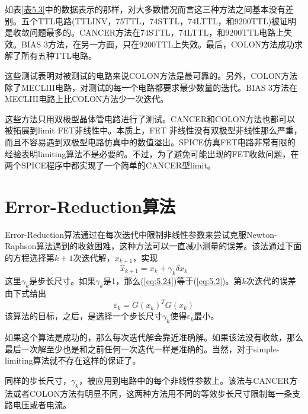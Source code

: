 如表\ref{表5.3}中的数据表示的那样，对大多数情况而言这三种方法之间基本没有差别。五个TTL电路(TTLINV，75TTL，74STTL，74LTTL，和9200TTL)被证明是收敛问题最多的。CANCER方法在74STTL，74LTTL，和9200TTL电路上失效。BIAS 3方法，在另一方面，只在9200TTL上失效。最后，COLON方法成功求解了所有五种TTL电路。

这些测试表明对被测试的电路来说COLON方法是最可靠的。另外，COLON方法除了MECLIII电路，对测试的每一个电路都要求最少数量的迭代。BIAS 3方法在MECLIII电路上比COLON方法少一次迭代。

这些方法只用双极型晶体管电路进行了测试。CANCER和COLON方法也都可以被拓展到limit FET非线性中。本质上，FET 非线性没有双极型非线性那么严重，而且不容易遇到双极型电路仿真中的数值溢出。SPICE仿真FET电路非常有限的经验表明limiting算法不是必要的。不过，为了避免可能出现的FET收敛问题，在两个SPICE程序中都实现了一个简单的CANCER型limit。

\section{Error-Reduction算法}
Error-Reduction算法通过在每次迭代中限制非线性参数来尝试克服Newton-Raphson算法遇到的收敛困难，这种方法可以一直减小测量的误差。该法通过下面的方程选择第$k+1$次迭代解，$x_{k+1}$，实现
\begin{equation}
    \hat{x}_{k+1} = x_k + \gamma_k \delta x_k
    \label{eq:5.24}
\end{equation}
这里$\gamma_k$是步长尺寸。如果$\gamma_k$是1，那么(\ref{eq:5.24})等于(\ref{eq:5.2})。第$k$次迭代的误差由下式给出
\begin{equation}
    \varepsilon_k = G(x_k)^TG(x_k)
    \label{eq:5.25}
\end{equation}
该算法的目标，之后，是选择一个步长尺寸$\gamma_k$使得$\varepsilon_k$最小\cite{ref-32}。

如果这个算法是成功的，那么每次迭代解会靠近准确解。如果该法没有收敛，那么最后一次解至少也是和之前任何一次迭代一样是准确的。当然，对于simple-limiting算法就不存在这样的保证了。

同样的步长尺寸，$\gamma_k$，被应用到电路中的每个非线性参数上。该法与CANCER方法或者COLON方法有明显不同，这两种方法用不同的等效步长尺寸限制每一条支路电压或者电流。

